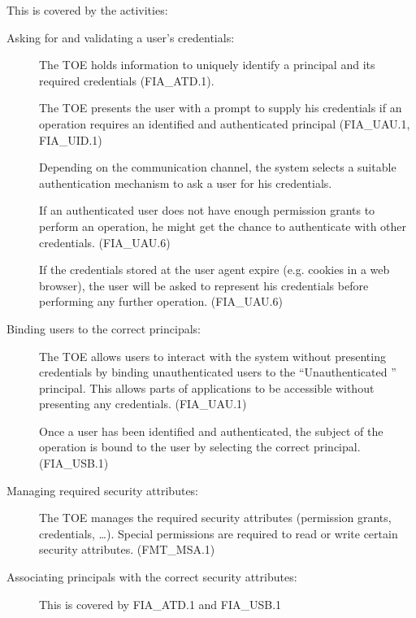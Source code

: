 \documentclass[12pt,english]{scrbook}
\begin{document}
    This is covered by the activities:

    \begin{description}
        \item[Asking for and validating a user's credentials:]

            The TOE holds information to uniquely identify a principal and its
            required credentials (FIA\_ATD.1).
            
            The TOE presents the user with a prompt to supply his credentials
            if an operation requires an identified and authenticated principal (FIA\_UAU.1, FIA\_UID.1)

            Depending on the communication channel, the system selects a
            suitable authentication mechanism to ask a user for his
            credentials. 

            If an authenticated user does not have enough permission grants to
            perform an operation, he might get the chance to authenticate with
            other credentials. (FIA\_UAU.6)

            If the credentials stored at the user agent expire (e.g.  cookies
            in a web browser), the user will be asked to represent his
            credentials before performing any further operation. (FIA\_UAU.6)

        \item[Binding users to the correct principals:]

            The TOE allows users to interact with the system without presenting
            credentials by binding unauthenticated users to the ``Unauthenticated ''
            principal. This allows parts of applications to be accessible without
            presenting any credentials. (FIA\_UAU.1)

            Once a user has been identified and authenticated, the subject of
            the operation is bound to the user by selecting the correct
            principal. (FIA\_USB.1)

        \item[Managing required security attributes:]

            The TOE manages the required security attributes (permission
            grants, credentials, \dots). Special permissions are required
            to read or write certain security attributes. (FMT\_MSA.1)

        \item[Associating principals with the correct security attributes:]

            This is covered by FIA\_ATD.1 and FIA\_USB.1

    \end{description}
\end{document}
